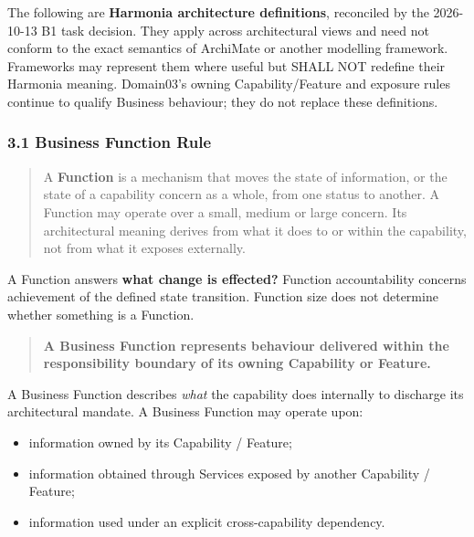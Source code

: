 \label{rad:metamodel:97}

The following are \textbf{Harmonia architecture definitions}, reconciled by the 2026-10-13 B1 task decision. They apply across architectural views and need not conform to the exact semantics of ArchiMate or another modelling framework. Frameworks may represent them where useful but SHALL NOT redefine their Harmonia meaning. Domain03's owning Capability/\allowbreak{}Feature and exposure rules continue to qualify Business behaviour; they do not replace these definitions.

\label{rad:metamodel:104}
\subsubsection*{3.1 Business Function Rule}
\label{rad:metamodel:106}

\begin{quote}

A \textbf{Function} is a mechanism that moves the state of information, or the state of a capability concern as a whole, from one status to another. A Function may operate over a small, medium or large concern. Its architectural meaning derives from what it does to or within the capability, not from what it exposes externally.


\end{quote}
\label{rad:metamodel:112}

A Function answers \textbf{what change is effected?} Function accountability concerns achievement of the defined state transition. Function size does not determine whether something is a Function.

\label{rad:metamodel:116}

\begin{quote}

\textbf{A Business Function represents behaviour delivered within the responsibility boundary of its owning Capability or Feature.}


\end{quote}
\label{rad:metamodel:118}

A Business Function describes \emph{what} the capability does internally to discharge its architectural mandate. A Business Function may operate upon:

\label{rad:metamodel:119}

\begin{itemize}

\item
information owned by its Capability /\allowbreak{} Feature;



\item
information obtained through Services exposed by another Capability /\allowbreak{} Feature;



\item
information used under an explicit cross-capability dependency.



\end{itemize}
\label{rad:metamodel:123}

